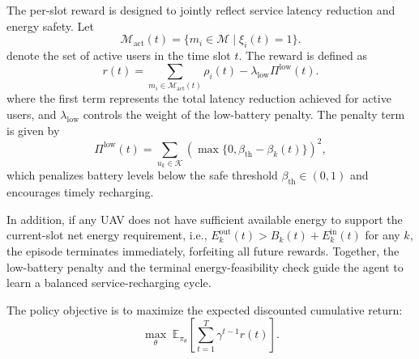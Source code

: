 \documentclass[journal]{IEEEtran}
\begin{document}
The per-slot reward is designed to jointly reflect service latency reduction
and energy safety. Let
\begin{equation}\label{eq:active_set}
\mathcal{M}_{\mathrm{act}}(t)=
\{m_i\in\mathcal{M}\mid \xi_i(t)=1\}.
\end{equation}
denote the set of active users in the time slot \(t\). The reward is defined as
\begin{equation}\label{eq:reward}
r(t)=\sum_{m_i\in\mathcal{M}_{\mathrm{act}}(t)} \rho_i(t)
-\lambda_{\mathrm{low}}\Pi^{\mathrm{low}}(t).
\end{equation}
where the first term represents the total latency reduction achieved for active
users, and \(\lambda_{\mathrm{low}}\) controls the weight of the low-battery
penalty. The penalty term is given by
\begin{equation}\label{eq:low_battery_penalty}
\Pi^{\mathrm{low}}(t)=
\sum_{u_k\in\mathcal{K}}
\left(
\max\{0,\beta_{\mathrm{th}}-\beta_k(t)\}
\right)^2,
\end{equation}
which penalizes battery levels below the safe threshold
$\beta_{\mathrm{th}}\in(0,1)$ and encourages timely recharging.

In addition, if any UAV does not have sufficient available energy to support
the current-slot net energy requirement, i.e.,
$E_k^{\mathrm{out}}(t)>B_k(t)+E_k^{\mathrm{in}}(t)$ for any $k$, the episode
terminates immediately, forfeiting all future rewards. Together, the
low-battery penalty and the terminal energy-feasibility check guide the agent
to learn a balanced service-recharging cycle.


The policy objective is to maximize the expected
discounted cumulative return:
\begin{equation}\label{eq:obj_mdp}
  \max_{\theta} \;
  \mathbb{E}_{\pi_\theta}\left[
    \sum_{t=1}^{T} \gamma^{t-1} r(t)
  \right].
\end{equation}
\end{document}
